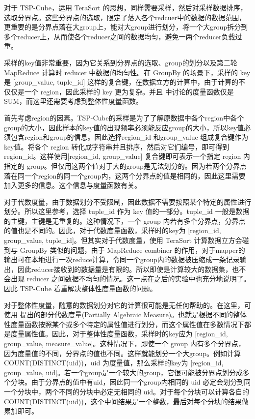 对于 TSP-Cube，运用 TeraSort 的思想，同样需要采样，然后对采样数据排序，选取分界点。这些分界点的选取，限定了落入各个redcuer中的数据的数据范围，更重要的是分界点落在大group上，能对大group进行划分，将一个大group拆分到多个reducer上，从而使各个reducer之间的数据均匀，避免一两个reducer负载过重。

采样的key值非常重要，因为它关系到分界点的选取、group的划分以及第二轮 MapReduce 计算时 reducer 中数据的均匀性。在 GroupBy 的场景下，采样的 key 是 [group\_value, tuple\_id] 这样的复合键，在数据立方的计算中，由于计算的不仅仅是一个 region，因此采样的 key 更为复杂。并且\cite{tao2013minimal} 中讨论的度量函数仅是 SUM，而这里还需要考虑到整体性度量函数。

首先考虑region的因素。TSP-Cube的采样是为了了解原数据中各个region中各个group的大小，因此样本的key值的出现频率必须能反应group的大小，所以key值必须包含region和group的信息。因此选择region\_id 和group\_value 组成复合键作为key值。将各个 region 转化成字符串并且排序，然后对它们编号，即可得到 region\_id。这样使用[region\_id, group\_value] 复合键即可表示一个指定 region 内指定的 group。但仅用这两个值对于大的group是无法划分的。因为若两个分界点落在同一个region的同一个group内，这两个分界点的值是相同的，因此这里需要加入更多的信息。这个信息与度量函数有关。

对于代数度量，由于数据划分不受限制，因此数据不需要按照某个特定的属性进行划分。所以这里参考\cite{tao2013minimal}，选择 tuple\_id 作为 key 值的一部分。tuple\_id 一般是数据的主键，主键是无重复的。这种情况下，一个 group 内若有多个分界点，分界点的值也是不同的。因此，对于代数度量函数，采样时的key为 [region\_id, group\_value, tuple\_id]。但其实对于代数度量，使用 TeraSort 计算数据立方会碰到与 GroupBy 类似的问题，由于 MapReduce combiner 的作用，对于mapper的输出可在本地进行一次reduce计算，令同一个group内的数据被压缩成一条记录输出，因此reducer接收到的数据量是有限的。所以即使是计算较大的数据集，也不会出现 reducer 之间数据不均匀的情况。这一点在之后的实验中也充分地说明了。因此 TSP-Cube 着重解决整体性度量函数的问题。

对于整体性度量，随意的数据划分对它的计算很可能是无任何帮助的。在这里，可使用 \cite{nandi2011distributed} 提出的部分代数度量(Partially Algebraic Measure)。也就是根据不同的整体性度量函数按照某个或多个特定的属性值进行划分，而这个属性值在多数情况下都是度量属性值。因此，对于整体性度量函数，采样时的key应为 [region\_id, group\_value, measure\_value]。这种情况下，即使一个 group 内有多个分界点，因为度量值的不同，分界点的值也不同。这样就能划分一个大group。例如计算 COUNT(DISTINCT(uid))，uid 为度量值，那么采样的key为 [region\_id, group\_value, uid]。若一个group是一个较大的group，它很可能被分界点划分成多个分块。由于分界点的值中有uid，因此同一个group内相同的 uid 必定会划分到同一个分块中，两个不同的分块中必定无相同的 uid。对于每个分块可以计算各自的 COUNT(DISTINCT(uid))，这个中间结果是一个整数，最后对每个分块的结果做累加即可。

